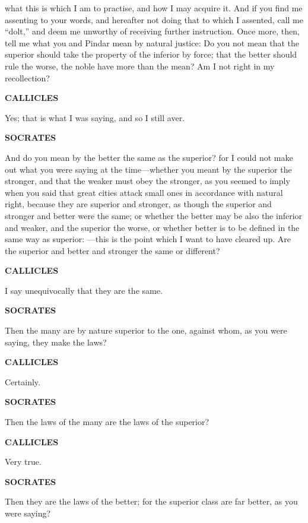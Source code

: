 \documentclass[11pt,letter]{article}
\begin{document}
what this is which I am to practise, and how I may acquire it. And if you find me assenting to your words, and hereafter not doing that to which I assented, call me “dolt,” and deem me unworthy of receiving further instruction. Once more, then, tell me what you and Pindar mean by natural justice:  Do you not mean that the superior should take the property of the inferior by force; that the better should rule the worse, the noble have more than the mean? Am I not right in my recollection?

\par \textbf{CALLICLES}
\par   Yes; that is what I was saying, and so I still aver.

\par \textbf{SOCRATES}
\par   And do you mean by the better the same as the superior? for I could not make out what you were saying at the time—whether you meant by the superior the stronger, and that the weaker must obey the stronger, as you seemed to imply when you said that great cities attack small ones in accordance with natural right, because they are superior and stronger, as though the superior and stronger and better were the same; or whether the better may be also the inferior and weaker, and the superior the worse, or whether better is to be defined in the same way as superior: —this is the point which I want to have cleared up. Are the superior and better and stronger the same or different?

\par \textbf{CALLICLES}
\par   I say unequivocally that they are the same.

\par \textbf{SOCRATES}
\par   Then the many are by nature superior to the one, against whom, as you were saying, they make the laws?

\par \textbf{CALLICLES}
\par   Certainly.

\par \textbf{SOCRATES}
\par   Then the laws of the many are the laws of the superior?

\par \textbf{CALLICLES}
\par   Very true.

\par \textbf{SOCRATES}
\par   Then they are the laws of the better; for the superior class are far better, as you were saying?
\end{document}
